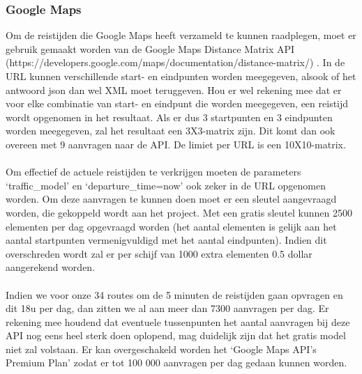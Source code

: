 \documentclass[ps,a4paper,oneside]{report}
\begin{document}
\subsubsection{Google Maps}
Om de reistijden die Google Maps heeft verzameld te kunnen raadplegen, moet er gebruik gemaakt worden van de Google Maps Distance Matrix API \\(https://developers.google.com/maps/documentation/distance-matrix/) . In de URL kunnen verschillende start- en eindpunten worden meegegeven, alsook of het antwoord json dan wel XML moet teruggeven. Hou er wel rekening mee dat er voor elke combinatie van start- en eindpunt die worden meegegeven, een reistijd wordt opgenomen in het resultaat. Als er dus 3 startpunten en 3 eindpunten worden meegegeven, zal het resultaat een 3X3-matrix zijn. Dit komt dan ook overeen met 9 aanvragen naar de API. De limiet per URL is een 10X10-matrix.\\\\
Om effectief de actuele reistijden te verkrijgen moeten de parameters \\‘traffic\_model’ en ‘departure\_time=now’ ook zeker in de URL opgenomen worden. Om deze aanvragen te kunnen doen moet er een sleutel aangevraagd worden, die gekoppeld wordt aan het project. Met een gratis sleutel kunnen 2500 elementen per dag opgevraagd worden (het aantal elementen is gelijk aan het aantal startpunten vermenigvuldigd met het aantal eindpunten). Indien dit overschreden wordt zal er per schijf van 1000 extra elementen 0.5 dollar aangerekend worden.\\\\
Indien we voor onze 34 routes om de 5 minuten de reistijden gaan opvragen en dit 18u per dag, dan zitten we al aan meer dan 7300 aanvragen per dag. Er rekening mee houdend dat eventuele tussenpunten het aantal aanvragen bij deze API nog eens heel sterk doen oplopend, mag duidelijk zijn dat het gratis model niet zal volstaan. Er kan overgeschakeld worden het ‘Google Maps API’s Premium Plan’ zodat er tot 100 000 aanvragen per dag gedaan kunnen worden.\\
\end{document}
